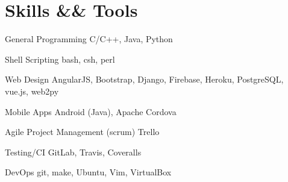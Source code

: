 \documentclass[10pt]{article}
\begin{document}
\section*{Skills \&\& Tools}
\begin{description}
  \begin{multicols}{2}
  \item[General Programming] C/C++, Java, Python
  \item[Shell Scripting] bash, csh, perl
  \item[Web Design] AngularJS, Bootstrap, Django, Firebase,
    Heroku, PostgreSQL, vue.js, web2py
  \item[Mobile Apps] Android (Java), Apache Cordova
  \item[Agile Project Management (scrum)] Trello
  \item[Testing/CI] GitLab, Travis, Coveralls
  \item[DevOps] git, make, Ubuntu, Vim, VirtualBox
  \end{multicols}
\end{description}
\end{document}
